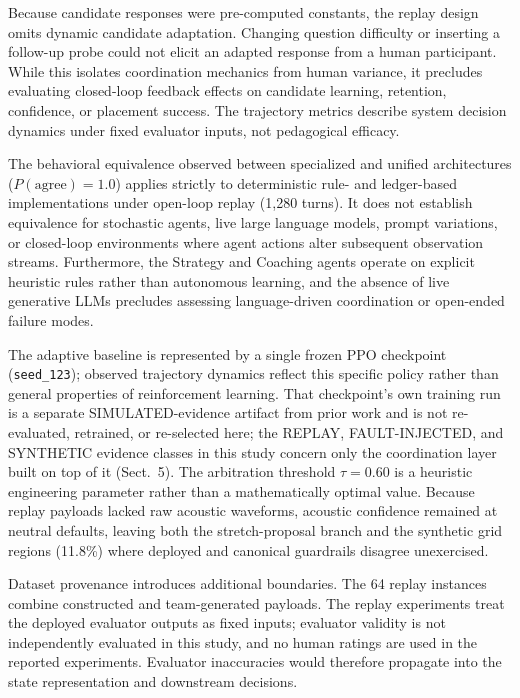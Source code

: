 \documentclass[runningheads]{llncs}
\begin{document}
Because candidate responses were pre-computed constants, the replay design omits dynamic candidate adaptation. Changing question difficulty or inserting a follow-up probe could not elicit an adapted response from a human participant. While this isolates coordination mechanics from human variance, it precludes evaluating closed-loop feedback effects on candidate learning, retention, confidence, or placement success. The trajectory metrics describe system decision dynamics under fixed evaluator inputs, not pedagogical efficacy.

The behavioral equivalence observed between specialized and unified architectures ($P(\mathrm{agree})=1.0$) applies strictly to deterministic rule- and ledger-based implementations under open-loop replay (1,280 turns). It does not establish equivalence for stochastic agents, live large language models, prompt variations, or closed-loop environments where agent actions alter subsequent observation streams. Furthermore, the Strategy and Coaching agents operate on explicit heuristic rules rather than autonomous learning, and the absence of live generative LLMs precludes assessing language-driven coordination or open-ended failure modes.

The adaptive baseline is represented by a single frozen PPO checkpoint (\texttt{seed\_123}); observed trajectory dynamics reflect this specific policy rather than general properties of reinforcement learning. That checkpoint's own training run is a separate SIMULATED-evidence artifact from prior work and is not re-evaluated, retrained, or re-selected here; the REPLAY, FAULT-INJECTED, and SYNTHETIC evidence classes in this study concern only the coordination layer built on top of it (Sect.~5). The arbitration threshold $\tau=0.60$ is a heuristic engineering parameter rather than a mathematically optimal value. Because replay payloads lacked raw acoustic waveforms, acoustic confidence remained at neutral defaults, leaving both the stretch-proposal branch and the synthetic grid regions (11.8\%) where deployed and canonical guardrails disagree unexercised.

Dataset provenance introduces additional boundaries. The 64 replay instances combine constructed and team-generated payloads. The replay experiments treat the deployed evaluator outputs as fixed inputs; evaluator validity is not independently evaluated in this study, and no human ratings are used in the reported experiments. Evaluator inaccuracies would therefore propagate into the state representation and downstream decisions.
\end{document}
